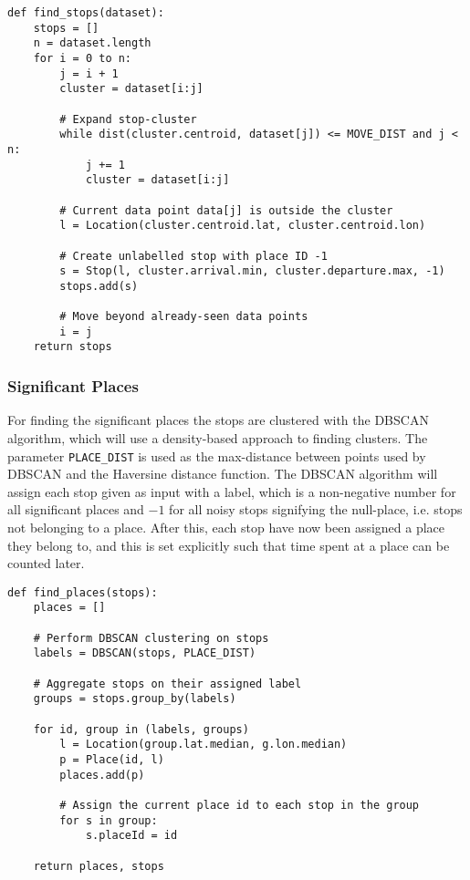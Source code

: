 \begin{verbatim}
def find_stops(dataset):
    stops = []
    n = dataset.length
    for i = 0 to n:
        j = i + 1
        cluster = dataset[i:j]
        
        # Expand stop-cluster
        while dist(cluster.centroid, dataset[j]) <= MOVE_DIST and j < n:
            j += 1
            cluster = dataset[i:j]
        
        # Current data point data[j] is outside the cluster 
        l = Location(cluster.centroid.lat, cluster.centroid.lon)

        # Create unlabelled stop with place ID -1
        s = Stop(l, cluster.arrival.min, cluster.departure.max, -1) 
        stops.add(s)
        
        # Move beyond already-seen data points
        i = j
    return stops
\end{verbatim}


\subsubsection{Significant Places}
For finding the significant places the stops are clustered with the DBSCAN algorithm, which will use a density-based approach to finding clusters. The parameter \verb|PLACE_DIST| is used as the max-distance between points used by DBSCAN and the Haversine distance function. The DBSCAN algorithm will assign each stop given as input with a label, which is a non-negative number for all significant places and $-1$ for all noisy stops signifying the null-place, i.e. stops not belonging to a place. After this, each stop have now been assigned a place they belong to, and this is set explicitly such that time spent at a place can be counted later.

\begin{verbatim}
def find_places(stops):
    places = []
    
    # Perform DBSCAN clustering on stops
    labels = DBSCAN(stops, PLACE_DIST)
    
    # Aggregate stops on their assigned label
    groups = stops.group_by(labels)
    
    for id, group in (labels, groups)
        l = Location(group.lat.median, g.lon.median)
        p = Place(id, l)
        places.add(p)
        
        # Assign the current place id to each stop in the group
        for s in group:
            s.placeId = id
    
    return places, stops
\end{verbatim}

